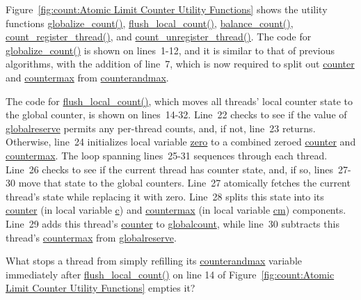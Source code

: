 Figure~\ref{fig:count:Atomic Limit Counter Utility Functions}
shows the utility functions
\url{globalize_count()},
\url{flush_local_count()},
\url{balance_count()},
\url{count_register_thread()}, and
\url{count_unregister_thread()}.
The code for \url{globalize_count()} is shown on lines~1-12, and
it is similar to that of previous algorithms, with the addition of
line~7, which is now required to split out \url{counter} and
\url{countermax} from \url{counterandmax}.

The code for \url{flush_local_count()}, which moves all threads' local
counter state to the global counter, is shown on lines~14-32.
Line~22 checks to see if the value of \url{globalreserve} permits
any per-thread counts, and, if not, line~23 returns.
Otherwise, line~24 initializes local variable \url{zero} to a combined
zeroed \url{counter} and \url{countermax}.
The loop spanning lines~25-31 sequences through each thread.
Line~26 checks to see if the current thread has counter state,
and, if so, lines~27-30 move that state to the global counters.
Line~27 atomically fetches the current thread's state
while replacing it with zero.
Line~28 splits this state into its \url{counter} (in local variable \url{c})
and \url{countermax} (in local variable \url{cm}) components.
Line~29 adds this thread's \url{counter} to \url{globalcount}, while
line~30 subtracts this thread's \url{countermax} from \url{globalreserve}.

\QuickQuiz{}
	What stops a thread from simply refilling its
	\url{counterandmax} variable immediately after
	\url{flush_local_count()} on line 14 of
	Figure~\ref{fig:count:Atomic Limit Counter Utility Functions}
	empties it?
 \QuickQuizEnd

